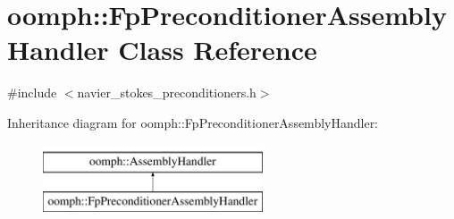 \hypertarget{classoomph_1_1FpPreconditionerAssemblyHandler}{}\section{oomph\+:\+:Fp\+Preconditioner\+Assembly\+Handler Class Reference}
\label{classoomph_1_1FpPreconditionerAssemblyHandler}


{\ttfamily \#include $<$navier\+\_\+stokes\+\_\+preconditioners.\+h$>$}

Inheritance diagram for oomph\+:\+:Fp\+Preconditioner\+Assembly\+Handler\+:\begin{figure}[H]
\begin{center}
\leavevmode
\includegraphics[height=2.000000cm]{classoomph_1_1FpPreconditionerAssemblyHandler}
\end{center}
\end{figure}
